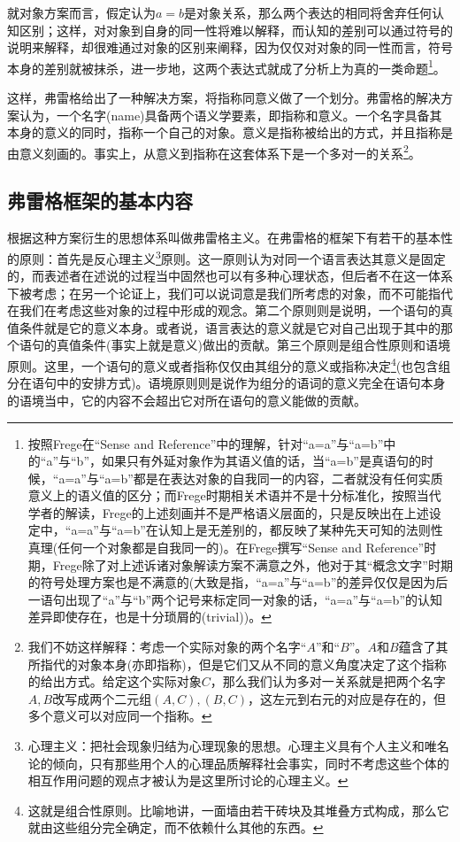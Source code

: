 \documentclass{article}
\begin{document}
就对象方案而言，假定认为$a=b$是对象关系，那么两个表达的相同将舍弃任何认知区别；这样，对对象到自身的同一性将难以解释，而认知的差别可以通过符号的说明来解释，却很难通过对象的区别来阐释，因为仅仅对对象的同一性而言，符号本身的差别就被抹杀，进一步地，这两个表达式就成了分析上为真的一类命题\footnote{按照Frege在“Sense and Reference”中的理解，针对“a=a”与“a=b”中的“a”与“b”，如果只有外延对象作为其语义值的话，当“a=b”是真语句的时候，“a=a”与“a=b”都是在表达对象的自我同一的内容，二者就没有任何实质意义上的语义值的区分；而Frege时期相关术语并不是十分标准化，按照当代学者的解读，Frege的上述刻画并不是严格语义层面的，只是反映出在上述设定中，“a=a”与“a=b”在认知上是无差别的，都反映了某种先天可知的法则性真理(任何一个对象都是自我同一的)。在Frege撰写“Sense and Reference”时期，Frege除了对上述诉诸对象解读方案不满意之外，他对于其“概念文字”时期的符号处理方案也是不满意的(大致是指，“a=a”与“a=b”的差异仅仅是因为后一语句出现了“a”与“b”两个记号来标定同一对象的话，“a=a”与“a=b”的认知差异即使存在，也是十分琐屑的(trivial))。}。

这样，弗雷格给出了一种解决方案，将{\heiti 指称}同{\heiti 意义}做了一个划分。弗雷格的解决方案认为，一个{\heiti 名字}(name)具备两个语义学要素，即指称和意义。一个名字具备其本身的意义的同时，指称一个自己的对象。意义是指称被给出的方式，并且指称是由意义刻画的。事实上，从意义到指称在这套体系下是一个多对一的关系\footnote{我们不妨这样解释：考虑一个实际对象的两个名字“$A$”和“$B$”。$A$和$B$蕴含了其所指代的对象本身(亦即指称)，但是它们又从不同的意义角度决定了这个指称的给出方式。给定这个实际对象$C$，那么我们认为多对一关系就是把两个名字$A,B$改写成两个二元组$(A,C),(B,C)$，这左元到右元的对应是存在的，但多个意义可以对应同一个指称。}。
\subsection{弗雷格框架的基本内容}
根据这种方案衍生的思想体系叫做{\heiti 弗雷格主义}。在弗雷格的框架下有若干的基本性的原则：首先是{\heiti 反心理主义\footnote{心理主义：把社会现象归结为心理现象的思想。心理主义具有个人主义和唯名论的倾向，只有那些用个人的心理品质解释社会事实，同时不考虑这些个体的相互作用问题的观点才被认为是这里所讨论的心理主义。}原则}。这一原则认为对同一个语言表达其意义是固定的，而表述者在述说的过程当中固然也可以有多种心理状态，但后者不在这一体系下被考虑；在另一个论证上，我们可以说词意是我们所考虑的对象，而不可能指代在我们在考虑这些对象的过程中形成的观念。第二个原则则是说明，一个语句的真值条件就是它的意义本身。或者说，语言表达的意义就是它对自己出现于其中的那个语句的真值条件(事实上就是意义)做出的贡献。第三个原则是{\heiti 组合性原则和语境原则}。这里，一个语句的意义或者指称仅仅由其组分的意义或指称决定\footnote{这就是组合性原则。比喻地讲，一面墙由若干砖块及其堆叠方式构成，那么它就由这些组分完全确定，而不依赖什么其他的东西。}(也包含组分在语句中的安排方式)。语境原则则是说作为组分的语词的意义完全在语句本身的语境当中，它的内容不会超出它对所在语句的意义能做的贡献。
\end{document}
